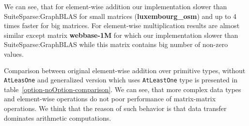 We can see, that for element-wise addition our implementation slower than SuiteSparse:GraphBLAS for small matrices (\textbf{luxembourg\_osm}) and up to 4 times faster for big matrices.
For element-wise multiplication results are almost similar except matrix \textbf{webbase-1M} for which our implementation slower than SuiteSparse:GraphBLAS while this matrix contains big number of non-zero values.

Comparison between original element-wise addition over primitive types, without \texttt{AtLeasOne} and generalized version which uses \texttt{AtLeastOne} type is presented in table~\ref{option-noOption-comparison}.
We can see, that more complex data types and element-wise operations do not poor performance of matrix-matrix operations. We think that the reason of such behavior is that data transfer dominates arithmetic computations.


